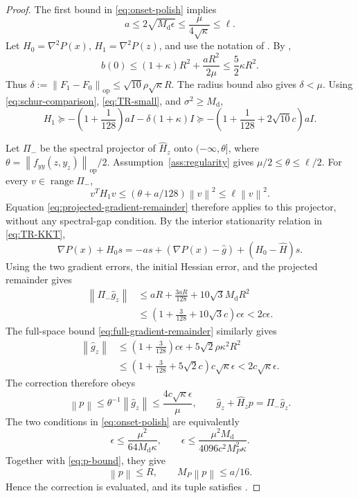 \documentclass[11pt]{article}
\numberwithin{equation}{section}
\newcommand{\eps}{\epsilon}
\newcommand{\norm}[1]{\left\lVert#1\right\rVert}
\newcommand{\op}{\mathrm{op}}
\newcommand{\Md}{M_{\mathrm d}}
\newcommand{\MP}{M_P}
\DeclareMathOperator{\range}{range}
\begin{document}
\begin{proof}
The first bound in \eqref{eq:onset-polish} implies
\begin{equation}\label{eq:a-small}
 a\le2\sqrt{\Md\eps}\le\frac{\mu}{4\sqrt\kappa}\le\ell.
\end{equation}
Let $H_0=\nabla^2P(x)$, $H_1=\nabla^2P(z)$, and use the notation
of . By ,
\[
 b(0)\le(1+\kappa)R^2+\frac{aR^2}{2\mu}
 \le\frac52\kappa R^2.
\]
Thus $\delta:=\norm{F_1-F_0}_{\op}\le\sqrt{10}\rho\sqrt\kappa R$.
The radius bound also gives $\delta<\mu$.
Using \eqref{eq:schur-comparison}, \eqref{eq:TR-small}, and
$\sigma^2\ge\Md$,
\begin{equation}\label{eq:endpoint-curvature}
 H_1\succeq
 -\left(1+\frac1{128}\right)aI-\delta(1+\kappa)I
 \succeq-\left(1+\frac1{128}+2\sqrt{10}c\right)aI.
\end{equation}

Let $\Pi_-$ be the spectral projector of $\widehat H_z$ onto
$(-\infty,\theta]$, where
$\theta=\norm{f_{yy}(z,y_z)}_{\op}/2$.
Assumption~\ref{ass:regularity} gives
$\mu/2\le\theta\le\ell/2$. For every $v\in\range\Pi_-$,
\[
 v^TH_1v\le(\theta+a/128)\norm v^2\le\ell\norm v^2.
\]
Equation \eqref{eq:projected-gradient-remainder} therefore applies
to this projector, without any spectral-gap condition.
By the interior stationarity relation in \eqref{eq:TR-KKT},
\[
 \nabla P(x)+H_0s
 =-as+(\nabla P(x)-\widehat g)
       +(H_0-\widehat H)s.
\]
Using the two gradient errors, the initial Hessian error, and the
projected remainder gives
\begin{equation}\label{eq:low-gradient}
\begin{split}
 \norm{\Pi_-\widehat g_z}
 &\le aR+\frac{3aR}{128}
       +10\sqrt3\Md R^2\\
 &\le\left(1+\frac3{128}+10\sqrt3c\right)c\eps
 <2c\eps.
\end{split}
\end{equation}
The full-space bound \eqref{eq:full-gradient-remainder} similarly
gives
\begin{equation}\label{eq:full-endpoint-gradient}
\begin{split}
 \norm{\widehat g_z}
 &\le\left(1+\frac3{128}\right)c\eps
         +5\sqrt2\rho\kappa^2R^2\\
 &\le\left(1+\frac3{128}+5\sqrt2c\right)c\sqrt\kappa\eps
 <2c\sqrt\kappa\eps.
\end{split}
\end{equation}
The correction therefore obeys
\begin{equation}\label{eq:p-bound}
 \norm p\le\theta^{-1}\norm{\widehat g_z}
 \le\frac{4c\sqrt\kappa\eps}{\mu},
 \qquad
 \widehat g_z+\widehat H_zp=\Pi_-\widehat g_z.
\end{equation}
The two conditions in \eqref{eq:onset-polish} are equivalently
\[
 \eps\le\frac{\mu^2}{64\Md\kappa},
 \qquad
 \eps\le\frac{\mu^2\Md}{4096c^2\MP^2\kappa}.
\]
Together with \eqref{eq:p-bound}, they give
\begin{equation}\label{eq:p-small}
 \norm p\le R,
 \qquad \MP\norm p\le a/16.
\end{equation}
Hence the correction is evaluated, and its tuple satisfies
.


\end{proof}
\end{document}
